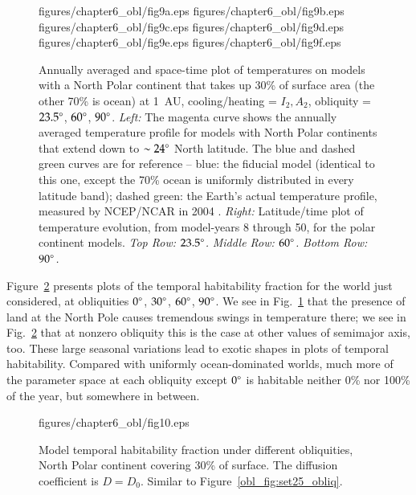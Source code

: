 \begin{figure}[p]
\plottwo
{figures/chapter6_obl/fig9a.eps}
{figures/chapter6_obl/fig9b.eps}\\
\plottwo
{figures/chapter6_obl/fig9c.eps}
{figures/chapter6_obl/fig9d.eps}\\
\plottwo
{figures/chapter6_obl/fig9e.eps}
{figures/chapter6_obl/fig9f.eps}\\
\caption[Annually averaged and space-time plot of temperatures on
models with a North Polar continent that takes up 30\% of surface area
at 1~AU, cooling/heating = $I_2,A_2$, obliquity = $23.5\degr$,
$60\degr$, $90\degr$.]{Annually averaged and space-time plot of
temperatures on models with a North Polar continent that takes up 30\%
of surface area (the other 70\% is ocean) at 1~AU, cooling/heating =
$I_2,A_2$, obliquity = $23.5\degr$, $60\degr$, $90\degr$. {\it Left:}
The magenta curve shows the annually averaged temperature profile for
models with North Polar continents that extend down to $\sim 24\mbox{$^\circ$}$
North latitude.  The blue and dashed green curves are for reference --
blue: the fiducial model (identical to this one, except the 70\% ocean
is uniformly distributed in every latitude band); dashed green: the
Earth's actual temperature profile, measured by NCEP/NCAR in 2004
\citep{kistler_et_al1999, kalnay_et_al1996}.  {\it Right:}
Latitude/time plot of temperature evolution, from model-years 8
through 50, for the polar continent models. {\it Top Row:
$23.5\degr$.}  {\it Middle Row: $60\degr$.}  {\it Bottom Row: $90\degr$.}}
\label{obl_fig:set31_23p5_60_90}
\end{figure}

\afterpage{\clearpage}

Figure~\ref{obl_fig:set26_obliq} presents plots of the temporal
habitability fraction for the world just considered, at obliquities
$0\mbox{$^\circ$}$, $30\mbox{$^\circ$}$, $60\degr$, $90\degr$.  We see in
Fig.~\ref{obl_fig:set31_23p5_60_90} that the presence of land at the
North Pole causes tremendous swings in temperature there; we see in
Fig.~\ref{obl_fig:set26_obliq} that at nonzero obliquity this is the
case at other values of semimajor axis, too.  These large seasonal
variations lead to exotic shapes in plots of temporal habitability.
Compared with uniformly ocean-dominated worlds, much more of the
parameter space at each obliquity except $0\mbox{$^\circ$}$ is habitable neither
0\% nor 100\% of the year, but somewhere in between.

\begin{figure}[p]
\plotone
{figures/chapter6_obl/fig10.eps}
\caption[Model temporal habitability fraction under different
obliquities, North Polar continent covering 30\% of surface.]{Model
temporal habitability fraction under different obliquities, North
Polar continent covering 30\% of surface.  The diffusion coefficient
is $D=D_0$.  Similar to Figure~\ref{obl_fig:set25_obliq}.}
\label{obl_fig:set26_obliq}
\end{figure}

